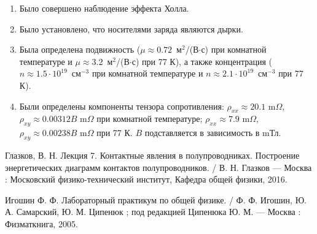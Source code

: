 \documentclass[a4paper, 12pt]{article}
\begin{document}
\begin{enumerate}
	\item Было совершено наблюдение эффекта Холла.
	
	\item Было установлено, что носителями заряда являются дырки.
	
	\item Была определена подвижность (\mbox{$\mu\approx 0.72$~м$^2$/(В$\cdot$с)} при комнатной температуре и \mbox{$\mu \approx3.2$~м$^2$/(В$\cdot$с)} при 77 К), а также концентрация ($n\approx 1.5 \cdot 10^{19}$~см$^{-3}$ при комнатной температуре и $n\approx 2.1 \cdot 10^{19}$~см$^{-3}$ при 77 К).
	
	\item Были определены компоненты тензора сопротивления: $\rho_{xx}\approx 20.1 \text{ m$\Omega$}$, $\rho_{xy}\approx0.00312B \text{ m$\Omega$}$ при комнатной температуре; $\rho_{xx}\approx 7.9 \text{ m$\Omega$}$, $\rho_{xy}\approx0.00238B \text{ m$\Omega$}$ при 77 К. $B$ подставляется в зависимость в mТл.
\end{enumerate}

\newpage

\begin{thebibliography}{2}
	Глазков, В. Н. Лекция 7. Контактные явления в полупроводниках. Построение энергетических диаграмм контактов полупроводников. / В. Н. Глазков --- Москва : Московский физико-технический институт, Кафедра общей физики, 2016.
	
	Игошин Ф. Ф. Лабораторный практикум по общей физике. / Ф. Ф. Игошин, Ю. А. Самарский, Ю. М. Ципенюк ; под редакцией Ципенюка Ю. М. --- Москва : Физматкнига, 2005.
\end{thebibliography}
\end{document}
